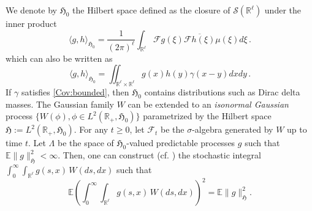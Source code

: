 \documentclass[12pt,reqno]{amsart}
\theoremstyle{remark}
\newcommand{\1}{\mathbf{1}}
\def\RR{\mathbb{R}}
\def\EE{\mathbb{E}}
\def\HH{\mathfrak{H}}
\def\cff{{\mathcal F}}
\def\lt{\left}
\def\rt{\right}
\def\HH{\mathfrak{H}}
\begin{document}
		We denote by  $\HH_0$ the Hilbert space defined as the closure of  $\mathcal{S}(\RR^\ell)$ under the inner product
		  \begin{equation}\label{HH0}
		  \langle g, h \rangle_{ \HH_0}=\frac 1{(2\pi)^\ell}  \int_{\RR^\ell}\mathcal{F}g(\xi)\overline{\mathcal{F}h(\xi)} \mu(\xi) d \xi\,.
		  \end{equation}
		which can also be written as 
		\begin{equation}\label{HH0.Cartest}
		  \langle g, h \rangle_{ \HH_0}=\iint_{\RR^\ell\times\RR^\ell}g(x)h(y)\gamma(x-y)dxdy \,.
		\end{equation}
		If $\gamma$ satisfies \ref{Cov:bounded}, then $\HH_0$ contains distributions such as Dirac delta masses. 
		The Gaussian family $W$ can be extended to an  {\it isonormal Gaussian} process $\{W(\phi), \phi \in L^2(\RR_+, \HH_0)\}$ parametrized by the Hilbert space $\HH:=L^2(\RR_+, \HH_0)$.
		For any $t\ge0$, let $\mathcal{F}_{t}$ be the $\sigma$-algebra generated by $W$ up to time $t$. 
		Let $\Lambda$ be the space of  $\HH_0$-valued predictable processes $g$  such that
		 $\EE\|g\|_{\HH}^{2}<\infty$. Then, one can construct (cf. \cite{HLN15}) the stochastic integral %
 $\int_0^\infty\int_{\mathbb{R}^\ell}g(s,x) \, W(ds,dx)$ %
  		such that
		\begin{equation}\label{int isometry}
		\EE  \lt( \int_0^\infty\int_{\mathbb{R}^\ell}g(s,x) \, W(ds,dx) \rt)^{2} 
		=
		\EE  \|g\|_{\HH}^{2}.
		\end{equation}
\end{document}
